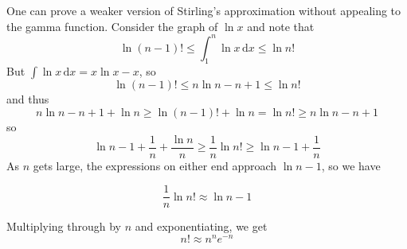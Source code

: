 \documentclass[12pt]{article}
\begin{document}
One can prove a weaker version of Stirling's approximation without appealing to the gamma function. Consider the graph of $\ln x$ and note that
\[\ln(n-1)!\leq \int_1^n \ln x \,\mathrm{d} x\leq \ln n!\]
But $\int \ln x \,\mathrm{d} x=x\ln x-x$, so
\[\ln(n-1)!\leq n\ln n-n+1\leq \ln n!\]
and thus
\[n\ln n-n+1+\ln n\geq\ln(n-1)!+\ln n=\ln n!\geq n\ln n-n+1\]
so
\[\ln n-1+\frac{1}{n}+\frac{\ln n}{n}\geq\frac{1}{n}\ln n!\geq\ln n-1+\frac{1}{n}\]
As $n$ gets large, the expressions on either end approach $\ln n-1$, so we have

\[\frac{1}{n}\ln n! \approx \ln n - 1\]

Multiplying through by $n$ and exponentiating, we get
\[n!\approx n^ne^{-n}\]
\end{document}

